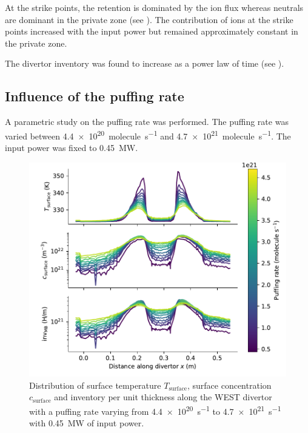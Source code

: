 At the strike points, the retention is dominated by the ion flux whereas neutrals are dominant in the private zone (see ).
The contribution of ions at the strike points increased with the input power but remained approximately constant in the private zone.

The divertor inventory was found to increase as a power law of time (see ).


\subsection{Influence of the puffing rate} 

A parametric study on the puffing rate was performed.
The puffing rate was varied between \SI{4.4e20}{molecule.s^{-1}} and \SI{4.7e21}{molecule.s^{-1}}.
The input power was fixed to \SI{0.45}{MW}.

\begin{figure}[h]
    \centering
    \includegraphics[width=\linewidth]{Figures/Chapter4/WEST/inventory_along_divertor.pdf}
    \caption{Distribution of surface temperature $T_\mathrm{surface}$, surface concentration $c_\mathrm{surface}$ and inventory per unit thickness along the WEST divertor with a puffing rate varying from \SI{4.4e20}{s^{-1}} to \SI{4.7e21}{s^{-1}} with \SI{0.45}{MW} of input power.}
\end{figure}

